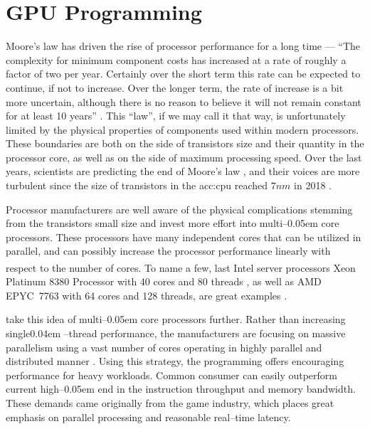 \chapter{GPU Programming}
\label{chap:gpu}

Moore's law has driven the rise of processor performance for a long time --- \enquote{The complexity for minimum component costs has increased at a rate of roughly a factor of two per year. Certainly over the short term this rate can be expected to continue, if not to increase. Over the longer term, the rate of increase is a bit more uncertain, although there is no reason to believe it will not remain constant for at least 10 years} \citep{MooresLaw}. This \enquote{law}, if we may call it that way, is unfortunately limited by the physical properties of components used within modern processors.
These boundaries are both on the side of transistors size and their quantity in the processor core, as well as on the side of maximum processing speed.
Over the last years, scientists are predicting the end of Moore's law \citep{MooresLawEnd}, and their voices are more turbulent since the size of transistors in the \acrfull{acc:cpu} reached $7nm$ in 2018 \citep{SamsungSevenNm}.

Processor manufacturers are well aware of the physical complications stemming from the transistors small size and invest more effort into multi--\kern0.05em core processors. These processors have many independent cores that can be utilized in parallel, and can possibly increase the processor performance linearly with respect to the number of cores. To name a few, last Intel server processors Xeon\textsuperscript{\textregistered} Platinum 8380 Processor with 40 cores and 80 threads \citep{IntelXeonPlatinum}, as well as AMD EPYC\texttrademark\ 7763 with 64 cores and 128 threads, are great examples \citep{AMDEpyc}.

 take this idea of multi--\kern0.05em core processors further. Rather than increasing single\kern0.04em --thread performance, the \gpu manufacturers are focusing on massive parallelism using a vast number of cores operating in highly parallel and distributed manner \citep{GPUComputingOwens}. Using this strategy, the \gpu programming offers encouraging performance for heavy workloads. Common consumer  can easily outperform current high--\kern0.05em end  in the instruction throughput and memory bandwidth. These demands came originally from the game industry, which places great emphasis on parallel processing and reasonable real--time latency.

